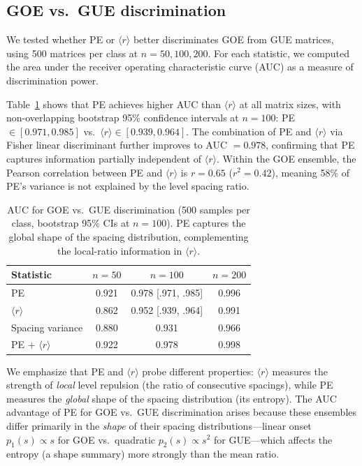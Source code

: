 \documentclass[aps,pre,twocolumn,superscriptaddress,showpacs]{revtex4-2}
\begin{document}
\subsection{GOE vs.\ GUE discrimination}
\label{sec:discrimination}

We tested whether PE or $\langle r \rangle$ better discriminates GOE from GUE matrices, using 500 matrices per class at $n = 50, 100, 200$. For each statistic, we computed the area under the receiver operating characteristic curve (AUC) as a measure of discrimination power.

Table~\ref{tab:auc} shows that PE achieves higher AUC than $\langle r \rangle$ at all matrix sizes, with non-overlapping bootstrap 95\% confidence intervals at $n = 100$: PE $\in [0.971, 0.985]$ vs.\ $\langle r \rangle \in [0.939, 0.964]$. The combination of PE and $\langle r \rangle$ via Fisher linear discriminant further improves to AUC $= 0.978$, confirming that PE captures information partially independent of $\langle r \rangle$. Within the GOE ensemble, the Pearson correlation between PE and $\langle r \rangle$ is $r = 0.65$ ($r^2 = 0.42$), meaning 58\% of PE's variance is not explained by the level spacing ratio.

\begin{table}[h]
\caption{AUC for GOE vs.\ GUE discrimination (500 samples per class, bootstrap 95\% CIs at $n = 100$). PE captures the global shape of the spacing distribution, complementing the local-ratio information in $\langle r \rangle$.}
\label{tab:auc}
\begin{ruledtabular}
\begin{tabular}{lccc}
Statistic & $n = 50$ & $n = 100$ & $n = 200$ \\
\midrule
PE & 0.921 & 0.978 [.971, .985] & 0.996 \\
$\langle r \rangle$ & 0.862 & 0.952 [.939, .964] & 0.991 \\
Spacing variance & 0.880 & 0.931 & 0.966 \\
PE $+$ $\langle r \rangle$ & 0.922 & 0.978 & 0.998 \\
\end{tabular}
\end{ruledtabular}
\end{table}

We emphasize that PE and $\langle r \rangle$ probe different properties: $\langle r \rangle$ measures the strength of \textit{local} level repulsion (the ratio of consecutive spacings), while PE measures the \textit{global} shape of the spacing distribution (its entropy). The AUC advantage of PE for GOE vs.\ GUE discrimination arises because these ensembles differ primarily in the \textit{shape} of their spacing distributions---linear onset $p_1(s) \propto s$ for GOE vs.\ quadratic $p_2(s) \propto s^2$ for GUE---which affects the entropy (a shape summary) more strongly than the mean ratio.
\end{document}
